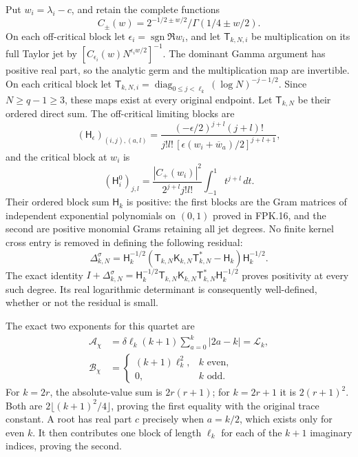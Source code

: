 Put $w_i=\lambda_i-c$, and retain the complete functions
\[
C_\pm(w)=2^{-1/2\pm w/2}/\Gamma(1/4\pm w/2).
\]
On each off-critical block let $\epsilon_i=\operatorname{sgn}\Re w_i$,
and let $\mathsf T_{k,N,i}$ be multiplication on its full Taylor
jet by $[C_{\epsilon_i}(w)N^{\epsilon_iw/2}]^{-1}$.
The dominant Gamma argument has positive real part, so the
analytic germ and the multiplication map are invertible. On
each critical block let
$\mathsf T_{k,N,i}=\operatorname{diag}_{0\le j<\ell_k}
(\log N)^{-j-1/2}$. Since $N\ge q-1\ge3$, these maps exist at
every original endpoint. Let $\mathsf T_{k,N}$ be their ordered
direct sum. The off-critical limiting blocks are
\[
(\mathsf H_\epsilon)_{(i,j),(a,l)}
=\frac{(-\epsilon/2)^{j+l}(j+l)!}
{j!l!\,[\epsilon(w_i+\overline w_a)/2]^{j+l+1}},
\]
and the critical block at $w_i$ is
\[
(\mathsf H_i^0)_{j,l}
=\frac{|C_+(w_i)|^2}{2^{j+l}j!l!}\int_{-1}^1t^{j+l}\,dt.
\]
Their ordered block sum $\mathsf H_k$ is positive: the first
blocks are the Gram matrices of independent exponential
polynomials on $(0,1)$ proved in FPK.16, and the second are
positive monomial Grams retaining all jet degrees. No finite
kernel cross entry is removed in defining the following residual:
\[
\Delta_{k,N}^\sigma
=\mathsf H_k^{-1/2}
 (\mathsf T_{k,N}\mathsf K_{k,N}\mathsf T_{k,N}^*
                                      -\mathsf H_k)
 \mathsf H_k^{-1/2}.
\tag{TWA20}
\]
The exact identity $I+\Delta_{k,N}^\sigma
=\mathsf H_k^{-1/2}\mathsf T_{k,N}\mathsf K_{k,N}
\mathsf T_{k,N}^*\mathsf H_k^{-1/2}$ proves positivity at every
such degree. Its real logarithmic determinant is consequently
well-defined, whether or not the residual is small.

The exact two exponents for this quartet are
\[
\begin{aligned}
\mathcal A_\chi
 &=\delta\ell_k(k+1)\sum_{a=0}^k|2a-k|
 =\mathcal L_k,\\
\mathcal B_\chi
 &=\begin{cases}(k+1)\ell_k^2,&k\text{ even},\\0,&k\text{ odd}.
\end{cases}
\end{aligned}\tag{TWA21}
\]
For $k=2r$, the absolute-value sum is $2r(r+1)$; for $k=2r+1$
it is $2(r+1)^2$. Both are $2\lfloor(k+1)^2/4\rfloor$,
proving the first equality with the original trace constant.
A root has real part $c$ precisely when $a=k/2$, which exists
only for even $k$. It then contributes one block of length
$\ell_k$ for each of the $k+1$ imaginary indices, proving the second.

